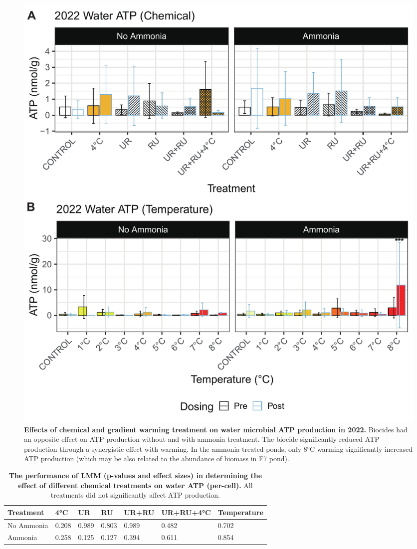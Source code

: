 \begin{figure}[H]
    \centering
    \includegraphics[scale=0.5]{./Figures/ATPW2022_bar}
    \caption{\textbf{Effects of chemical and gradient warming treatment on water microbial ATP production in 2022.} Biocides had an opposite effect on ATP production without and with ammonia treatment. The biocide significantly reduced ATP production through a synergistic effect with warming. In the ammonia-treated ponds, only 8°C warming significantly increased ATP production (which may be also related to the abundance of biomass in F7 pond).}
    \label{fig:ATPW2022_cp}
\end{figure}

\begin{table}[H]
    \caption{{\bf The performance of LMM (p-values and effect sizes) in determining the effect of different chemical treatments on water ATP (per-cell).} All treatments did not significantly affect ATP production.}
    \centering
    \begin{tabular}{ m{2.5cm}<{\centering}m{1.5cm}<{\centering}m{1.5cm}<{\centering}m{1.5cm}<{\centering}m{1.5cm}<{\centering}m{2.2cm}<{\centering}m{2.2cm}<{\centering}}
    \toprule
    Treatment & 4°C & UR & RU & UR+RU & UR+RU+4°C & Temperature \\
     \midrule
    No Ammonia & 0.208 & 0.989 & 0.803 & 0.989 & 0.482 & 0.702 \\
    Ammonia & 0.258 & 0.125 & 0.127 & 0.394 & 0.611 & 0.854 \\
    \bottomrule
    \end{tabular}    
    \label{tab:ATPpc_treat}
\end{table}

